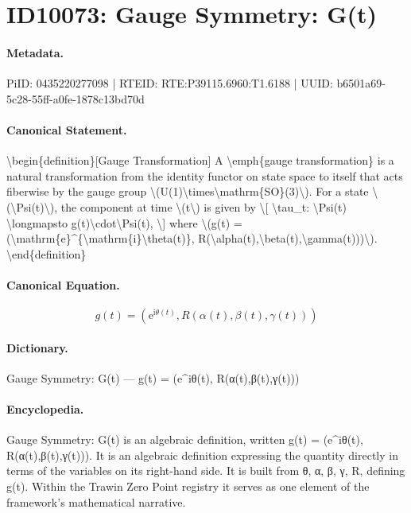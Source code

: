 \section*{ID10073: Gauge Symmetry: G(t)}
\paragraph{Metadata.}
PiID: 0435220277098 | RTEID: RTE:P39115.6960:T1.6188 | UUID: b6501a69-5c28-55ff-a0fe-1878c13bd70d

\paragraph{Canonical Statement.}
\textbackslash{}begin\{definition\}[Gauge Transformation] A \textbackslash{}emph\{gauge transformation\} is a natural transformation from the identity functor on state space to itself that acts fiberwise by the gauge group \textbackslash{}(U(1)\textbackslash{}times\textbackslash{}mathrm\{SO\}(3)\textbackslash{}). For a state \textbackslash{}(\textbackslash{}Psi(t)\textbackslash{}), the component at time \textbackslash{}(t\textbackslash{}) is given by \textbackslash{}[ \textbackslash{}tau\_t: \textbackslash{}Psi(t) \textbackslash{}longmapsto g(t)\textbackslash{}cdot\textbackslash{}Psi(t), \textbackslash{}] where \textbackslash{}(g(t) = (\textbackslash{}mathrm\{e\}\textasciicircum{}\{\textbackslash{}mathrm\{i\}\textbackslash{}theta(t)\}, R(\textbackslash{}alpha(t),\textbackslash{}beta(t),\textbackslash{}gamma(t)))\textbackslash{}). \textbackslash{}end\{definition\}

\paragraph{Canonical Equation.}
\[
g(t) = (\mathrm{e}^{\mathrm{i}\theta(t)}, R(\alpha(t),\beta(t),\gamma(t)))
\]

\paragraph{Dictionary.}
Gauge Symmetry: G(t) — g(t) = (e\textasciicircum{}iθ(t), R(α(t),β(t),γ(t)))

\paragraph{Encyclopedia.}
Gauge Symmetry: G(t) is an algebraic definition, written g(t) = (e\textasciicircum{}iθ(t), R(α(t),β(t),γ(t))). It is an algebraic definition expressing the quantity directly in terms of the variables on its right-hand side. It is built from θ, α, β, γ, R, defining g(t). Within the Trawin Zero Point registry it serves as one element of the framework's mathematical narrative.
